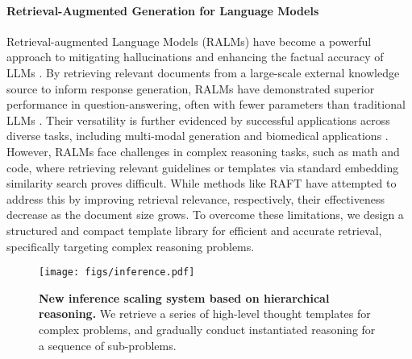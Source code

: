 \paragraph{Retrieval-Augmented Generation for Language Models}
Retrieval-augmented Language Models (RALMs) have become a powerful approach to mitigating hallucinations and enhancing the factual accuracy of LLMs \citep{asai2023retrieval,mialon2023augmented,shi2023replug,gao2023retrieval,zhao2024retrieval}. By retrieving relevant documents from a large-scale external knowledge source \citep{borgeaud2022improving} to inform response generation, RALMs have demonstrated superior performance in question-answering, often with fewer parameters than traditional LLMs \citep{mialon2023augmented}. Their versatility is further evidenced by successful applications across diverse tasks, including multi-modal generation and biomedical applications \citep{yasunaga2023retrieval,izacard2023atlas,wang2022retrieval,zhao2024retrieval,borgeaud2022improving,yang2023prompt}.  However, RALMs face challenges in complex reasoning tasks, such as math and code, where retrieving relevant guidelines or templates via standard embedding similarity search proves difficult. While methods like RAFT \citep{RAFT} have attempted to address this by improving retrieval relevance, respectively, their effectiveness decrease as the document size grows.  To overcome these limitations, we design a structured and compact template library for efficient and accurate retrieval, specifically targeting complex reasoning problems.




    

\begin{figure*}[tp]
    \centering
    \texttt{[image: figs/inference.pdf]}
    \caption{\textbf{New inference scaling system based on hierarchical reasoning.} We retrieve a series of high-level thought templates for complex problems, and gradually conduct instantiated reasoning for a sequence of sub-problems. }
    \vspace{-0.2in}
    \label{pic-inference}
\end{figure*}


